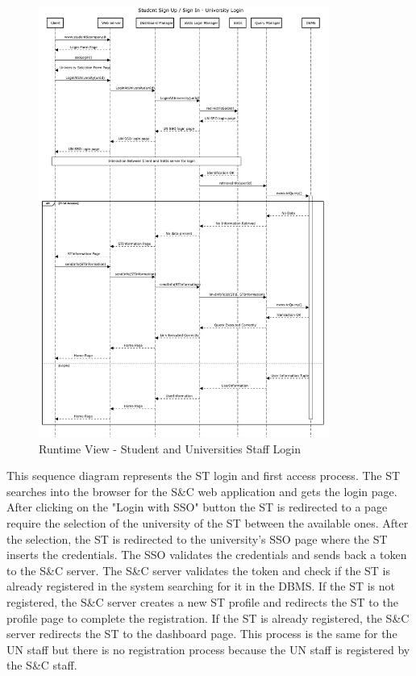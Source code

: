 \begin{figure}[H]
      \centering
      \includegraphics[width=0.85\textwidth]{Images/RV_01a.pdf}
      \caption{Runtime View - Student and Universities Staff Login}
      \label{fig:rv-student-login}
\end{figure}

\par This sequence diagram represents the ST login and first access process. The ST searches into the browser for the
S\&C web application and gets the login page. After clicking on the "Login with SSO" button the ST is redirected to
a page require the selection of the university of the ST between the available ones. After the selection, the ST is redirected
to the university's SSO page where the ST inserts the credentials. The SSO validates the credentials and sends back a
token to the S\&C server. The S\&C server validates the token and check if the ST is already registered in the system searching
for it in the DBMS. If the ST is not registered, the S\&C server creates a new ST profile and redirects the ST to the
profile page to complete the registration. If the ST is already registered, the S\&C server redirects the ST to the
dashboard page.
This process is the same for the UN staff but there is no registration process because the UN staff is registered by the S\&C staff.

